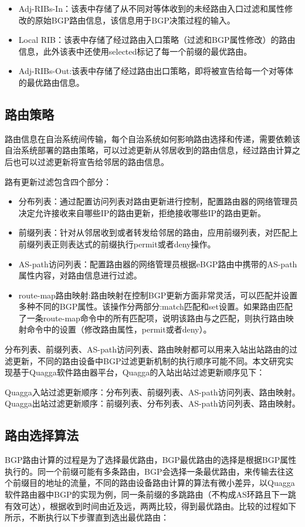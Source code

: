 \begin{itemize}
    \item Adj-RIBs-In：该表中存储了从不同对等体收到的未经路由入口过滤和属性修改的原始BGP路由信息，该信息用于BGP决策过程的输入。
    \item Local RIB：该表中存储了经过路由入口策略（过滤和BGP属性修改）的路由信息，此外该表中还使用selected标记了每一个前缀的最优路由。
    \item Adj-RIBs-Out:该表中存储了经过路由出口策略，即将被宣告给每一个对等体的最优路由信息。
  \end{itemize}

\subsection{路由策略}
路由信息在自治系统间传输，每个自治系统如何影响路由选择和传递，需要依赖该自治系统部署的路由策略\cite{DianeTeare2016CCNP}，可以过滤更新从邻居收到的路由信息，经过路由计算之后也可以过滤更新将宣告给邻居的路由信息。

路有更新过滤包含四个部分：
\begin{itemize}
    \item 分布列表：通过配置访问列表对路由更新进行控制，配置路由器的网络管理员决定允许接收来自哪些IP的路由更新，拒绝接收哪些IP的路由更新。
    \item 前缀列表：针对从邻居收到或者转发给邻居的路由，应用前缀列表，对匹配上前缀列表正则表达式的前缀执行permit或者deny操作。
    \item AS-path访问列表：配置路由器的网络管理员根据eBGP路由中携带的AS-path属性内容，对路由信息进行过滤。
    \item route-map路由映射:路由映射在控制BGP更新方面非常灵活，可以匹配并设置多种不同的BGP属性。该操作分两部分:match匹配和set设置。如果路由匹配了一条route-map命令中的所有匹配项，说明该路由与之匹配，则执行路由映射命令中的设置（修改路由属性，permit或者deny）。
\end{itemize}


分布列表、前缀列表、AS-path访问列表、路由映射都可以用来入站出站路由的过滤更新，不同的路由设备中BGP过滤更新机制的执行顺序可能不同。本文研究实现基于Quagga\cite{quagga}软件路由器平台，Quagga的入站出站过滤更新顺序见下：

Quagga入站过滤更新顺序：分布列表、前缀列表、AS-path访问列表、路由映射。
Quagga出站过滤更新顺序：前缀列表、分布列表、AS-path访问列表、路由映射。

\subsection{路由选择算法}
BGP路由计算\cite{DianeTeare2016CCNP}的过程是为了选择最优路由，BGP最优路由的选择是根据BGP属性执行的。同一个前缀可能有多条路由，BGP会选择一条最优路由，来传输去往这个前缀目的地址的流量，不同的路由设备路由计算的算法有微小差异，以Quagga软件路由器中BGP的实现为例，同一条前缀的多跳路由（不构成AS环路且下一跳有效可达），根据收到时间由近及远，两两比较，得到最优路由。比较的过程如下所示，不断执行以下步骤直到选出最优路由：

